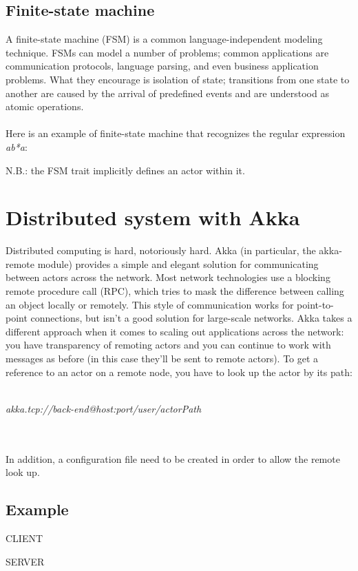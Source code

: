 \documentclass{article}
\begin{document}
\subsection{Finite-state machine}
A finite-state machine (FSM) is a common language-independent modeling technique. FSMs can model a number of problems; common applications are communication protocols, language parsing, and even business application problems. What they encourage is isolation of state; transitions from one state to another are caused by the arrival of predefined events and are understood as atomic operations. \\ \\
Here is an example of finite-state machine that recognizes the regular expression \textit{ab*a}:

\vskip 0.5cm
N.B.: the FSM trait implicitly defines an actor within it.

\section{Distributed system with Akka}
Distributed computing is hard, notoriously hard. Akka (in particular, the akka-remote module) provides a simple and elegant solution for communicating between actors across the network. Most network technologies use a blocking remote procedure call (RPC), which tries to mask the difference between calling an object locally or remotely. This style of communication works for point-to-point connections, but isn't a good solution for large-scale networks. Akka takes a different approach when it comes to scaling out applications across the network: you have transparency of remoting actors and you can continue to work with messages as before (in this case they'll be sent to remote actors).
To get a reference to an actor on a remote node, you have to look up the actor by its path: \\ \\
\centerline{\textit{akka.tcp://back-end@host:port/user/actorPath}}
\\ \\
In addition, a configuration file need to be created in order to allow the remote look up.
\subsection{Example}
CLIENT

\vskip 0.3cm
SERVER

\end{document}

